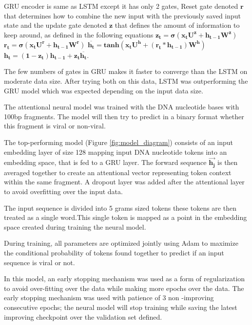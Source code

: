 \documentclass[conference]{IEEEtran}
\begin{document}
GRU encoder is same as LSTM except it has only 2 gates, Reset gate denoted $\mathbf{r}$ that determines how to combine the new input with the previously saved input state and the update gate denoted $\mathbf{z}$ that defines the amount of information to keep around, as defined  in the following equations \newline
$\mathbf{z_{t}=\sigma(x_{t}U^z + h_{t-1}W^z)}$ \newline
$\mathbf{r_{t}=\sigma(x_{t}U^r + h_{t-1}W^r)}$ \newline
$\mathbf{\overline{h_{t}} = tanh(x_{t}U^h + (r_{t} * h_{t-1})W^h )}$ \newline
$\mathbf{ h_{t} = (1-z_{t})h_{t-1} +z_{t}\overline{h_{t}}}$.

The few numbers of gates in GRU makes it faster to converge than the LSTM on moderate data size. After trying both on this data, LSTM was outperforming the GRU model which was expected depending on the input data size.

The attentional neural model was trained with the DNA nucleotide bases with 100bp fragments. The model will then try to predict in a binary format whether this fragment is viral or non-viral.

The top-performing model (Figure \ref{fig:model_diagram}) consists of an input embedding layer of size 128 mapping input DNA nucleotide tokens into an embedding space, that is fed to a GRU layer. The forward sequence $\mathbf{\overrightarrow{h_{j}}}$ is then averaged together to create an attentional vector representing token context within the same fragment. A dropout layer was added after the attentional layer to avoid overfitting over the input data.

The input sequence is divided into 5 grams sized tokens these tokens are then treated as a single word.This single token is mapped as a point in the embedding space created during training the neural model.

During training, all parameters are optimized jointly using Adam to maximize the conditional probability of tokens found together to predict if an input sequence is viral or not.

In this model, an early stopping mechanism was used as a form of regularization to avoid over-fitting over the data while making more epochs over the data. The early stopping mechanism was used with patience of 3 non -improving consecutive epochs; the neural model will stop training while saving the latest improving checkpoint over the validation set defined.
\end{document}
